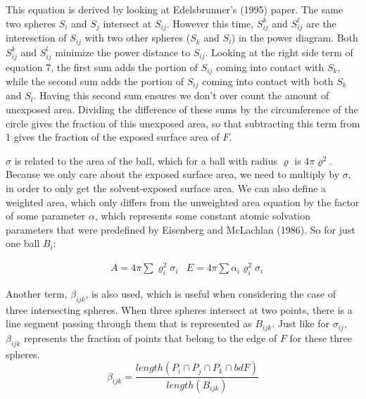 \documentclass{article}
\begin{document}
This equation is derived by looking at Edelsbrunner's (1995) paper. The same two spheres $S_i$ and $S_j$ intersect at $S_{ij}$. However this time, $S^k_{ij}$ and $S^l_{ij}$ are the interesction of $S_{ij}$ with two other spheres ($S_k$ and $S_l$) in the power diagram. Both  $S^k_{ij}$ and $S^l_{ij}$ minimize the power distance to $S_{ij}$. Looking at the right side term of equation 7, the first sum adds the portion of $S_{ij}$ coming into contact with $S_k$, while the second sum adds the portion of $S_{ij}$ coming into contact with both $S_k$ and $S_l$. Having this second sum ensures we don't over count the amount of unexposed area. Dividing the difference of these sums by the circumference of the circle gives the fraction of this unexposed area, so that subtracting this term from 1 gives the fraction of the exposed surface area of $F$.

$\sigma$ is related to the area of the ball, which for a ball with radius $\varrho$ is $4\pi\varrho^2$. Because we only care about the exposed surface area, we need to multiply by $\sigma$, in order to only get the solvent-exposed surface area. We can also define a weighted area, which only differs from the unweighted area equation by the factor of some parameter $\alpha$, which represents some constant atomic solvation parameters that were predefined by Eisenberg and McLachlan (1986). So for just one ball $B_i$:

\begin{align*}
&A = 4\pi\sum \varrho_i^2\sigma_i
&E = 4\pi\sum\alpha_i\varrho_i^2\sigma_i
\end{align*}

Another term, $\beta_{ijk}$, is also used, which is useful when considering the case of three intersecting spheres. When three spheres intersect at two points, there is a line segment passing through them that is represented as $B_{ijk}$. Just like for $\sigma_{ij}$, $\beta_{ijk}$ represents the fraction of points that belong to the edge of $F$ for these three spheres.
\begin{equation}
\beta_{ijk} = \frac{length(P_i \cap P_j \cap P_k \cap bd F)}{length(B_{ijk})}
\end{equation}
\end{document}
